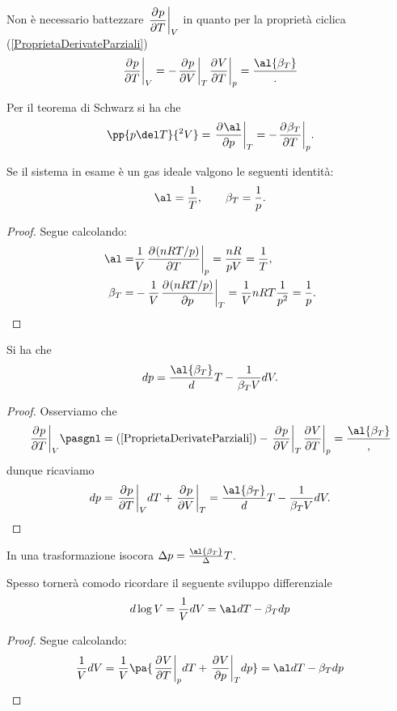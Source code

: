 \begin{remark}
Non \`e necessario battezzare $\displaystyle\ppb TpV$ in quanto per la propriet\`a ciclica (\ref{ProprietaDerivateParziali})
\[\ppb TpV=-\ppb VpT\ppb TVp=\frac\al{\beta_T}.\]
\end{remark}

\begin{remark}
Per il teorema di Schwarz si ha che
\[\pp{p\del T}{^2V}=\ppb p\al T=-\ppb T{\beta_T}p.\]
\end{remark}

\begin{proposition}\label{CoefficienteEspansioneECompressibilitaIsotermaPerGasIdeali}
Se il sistema in esame \`e un gas ideale valgono le seguenti identit\`a:
\[\al=\frac 1T,\qquad \beta_T=\frac 1p.\]
\end{proposition}
\begin{proof}
Segue calcolando:
\begin{align*}
\al=&\frac1V\ppb T{(nRT/p)}p=\frac{nR}{pV}=\frac1T,\\
\beta_T=&-\frac1V\ppb p{(nRT/p)}T=\frac1V nRT\frac1{p^2}=\frac1p.
\end{align*}
\end{proof}

\begin{proposition}\label{DifferenzialePressione}
Si ha che
\[dp=\frac\al{\beta_T}dT-\frac1{\beta_T V}dV.\]
\end{proposition}
\begin{proof}
Osserviamo che
\[\ppb TpV\pasgnl={(\ref{ProprietaDerivateParziali})}-\ppb VpT \ppb TVp=\frac \al{\beta_T},\]
dunque ricaviamo
\[dp=\ppb TpVdT+\ppb VpT=\frac\al{\beta_T}dT-\frac1{\beta_T V}dV.\]
\end{proof}
\begin{corollary}
In una trasformazione isocora $\Delta p=\frac\al{\beta_T}\Delta T$.
\end{corollary}

\begin{remark}\label{DifferenzialeLogaritmicoNelVolume}
Spesso torner\`a comodo ricordare il seguente sviluppo differenziale
\[d\log V=\frac1VdV=\al dT-\beta_T dp\]
\end{remark}
\begin{proof}
Segue calcolando:
\[\frac1VdV=\frac1V\pa{\ppb TVp dT+\ppb pVTdp}=\al dT-\beta_T dp\]
\end{proof}


